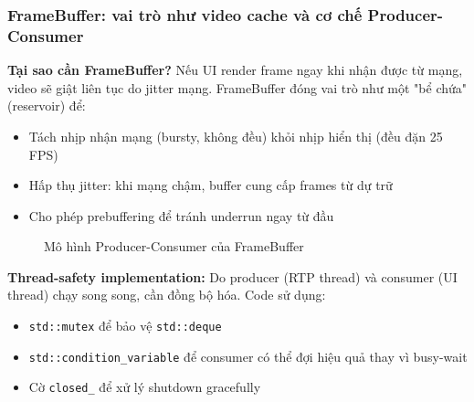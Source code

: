\subsubsection{FrameBuffer: vai trò như video cache và cơ chế Producer-Consumer}

\textbf{Tại sao cần FrameBuffer?} Nếu UI render frame ngay khi nhận được từ mạng, video sẽ giật liên tục do jitter mạng. FrameBuffer đóng vai trò như một "bể chứa" (reservoir) để:
\begin{itemize}
\item Tách nhịp nhận mạng (bursty, không đều) khỏi nhịp hiển thị (đều đặn 25 FPS)
\item Hấp thụ jitter: khi mạng chậm, buffer cung cấp frames từ dự trữ
\item Cho phép prebuffering để tránh underrun ngay từ đầu
\end{itemize}

\begin{figure}[H]
    \centering
    \caption{Mô hình Producer-Consumer của FrameBuffer}
    \label{fig:framebuffer_cache}
    \end{figure}

\textbf{Thread-safety implementation:} Do producer (RTP thread) và consumer (UI thread) chạy song song, cần đồng bộ hóa. Code sử dụng:
\begin{itemize}
\item \texttt{std::mutex} để bảo vệ \texttt{std::deque}
\item \texttt{std::condition\_variable} để consumer có thể đợi hiệu quả thay vì busy-wait
\item Cờ \texttt{closed\_} để xử lý shutdown gracefully
\end{itemize}

